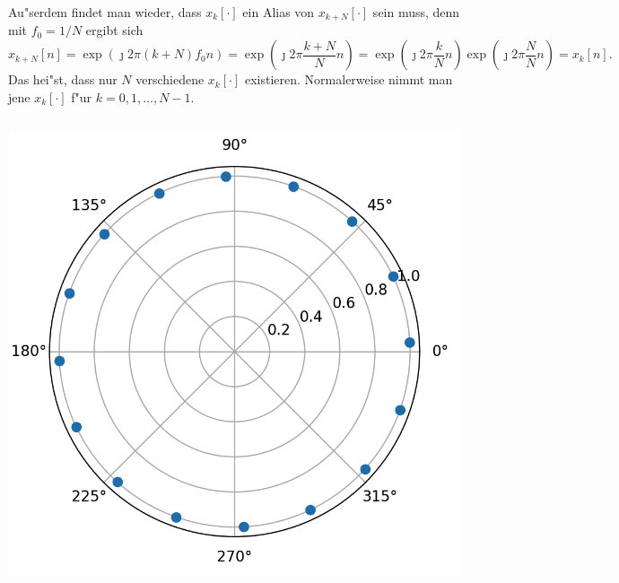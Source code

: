 Au"serdem findet man wieder, dass $x_k[\cdot]$ ein Alias von $x_{k+N}[\cdot]$ sein muss, denn mit $f_0 = 1/N$ ergibt sich
\[
 x_{k+N}[n] = \exp\left(
        \jmath 2 \pi (k + N) f_0 n
    \right)
    = \exp\left(
        \jmath 2 \pi \frac{k + N}{N} n
    \right)
    = \exp\left(
        \jmath 2 \pi \frac{k}{N} n
    \right) 
    \exp\left(
        \jmath 2 \pi \frac NN n
    \right) 
    = x_k[n].
\]
Das hei"st, dass nur $N$ verschiedene $x_k[\cdot]$ existieren.
Normalerweise nimmt man jene $x_k[\cdot]$ f"ur $k = 0, 1, \ldots, N-1$.
%
\begin{listing}
    \noindent
    \begin{minipage}{0.49\textwidth}
        \strut\vspace*{-\baselineskip}\newline
        \inputminted[firstline=4]{python3}{code/disc_harms_comp.py}
    \end{minipage}%
    \begin{minipage}{0.3\textwidth}
        \strut\vspace*{-\baselineskip}\newline
        \includegraphics[width=\textwidth]{code/disc_harms_comp.png}


\end{minipage}
\end{listing}
